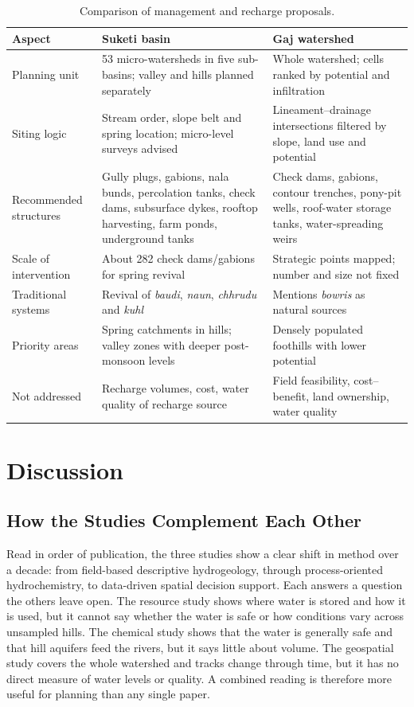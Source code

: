 \documentclass[10pt,a4paper,twocolumn]{article}
\begin{document}
\begin{table}[t]
\centering
\caption{Comparison of management and recharge proposals.}
\label{tab:manage}
\small
\begin{tabularx}{\textwidth}{@{}P{3.0cm}LL@{}}
\toprule
\textbf{Aspect} & \textbf{Suketi basin \citep{pophare2015}} & \textbf{Gaj watershed \citep{sharma2025}}\\
\midrule
Planning unit & 53 micro-watersheds in five sub-basins; valley and hills planned separately & Whole watershed; cells ranked by potential and infiltration\\
Siting logic & Stream order, slope belt and spring location; micro-level surveys advised & Lineament--drainage intersections filtered by slope, land use and potential\\
Recommended structures & Gully plugs, gabions, nala bunds, percolation tanks, check dams, subsurface dykes, rooftop harvesting, farm ponds, underground tanks & Check dams, gabions, contour trenches, pony-pit wells, roof-water storage tanks, water-spreading weirs\\
Scale of intervention & About 282 check dams/gabions for spring revival & Strategic points mapped; number and size not fixed\\
Traditional systems & Revival of \textit{baudi}, \textit{naun}, \textit{chhrudu} and \textit{kuhl} & Mentions \textit{bowris} as natural sources\\
Priority areas & Spring catchments in hills; valley zones with deeper post-monsoon levels & Densely populated foothills with lower potential\\
Not addressed & Recharge volumes, cost, water quality of recharge source & Field feasibility, cost--benefit, land ownership, water quality\\
\bottomrule
\end{tabularx}
\end{table}

\section{Discussion}

\subsection{How the Studies Complement Each Other}

Read in order of publication, the three studies show a clear shift in method over a decade:
from field-based descriptive hydrogeology, through process-oriented hydrochemistry, to
data-driven spatial decision support. Each answers a question the others leave open. The
resource study shows where water is stored and how it is used, but it cannot say whether the
water is safe or how conditions vary across unsampled hills. The chemical study shows that the
water is generally safe and that hill aquifers feed the rivers, but it says little about volume.
The geospatial study covers the whole watershed and tracks change through time, but it has no
direct measure of water levels or quality. A combined reading is therefore more useful for
planning than any single paper.
\end{document}
